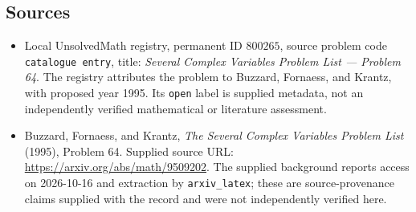 \documentclass[11pt]{article}
\begin{document}
\subsection{Sources}
\begin{itemize}
\item Local UnsolvedMath registry, permanent ID \(800265\), source problem code \texttt{catalogue entry}, title: \emph{Several Complex Variables Problem List --- Problem 64}. The registry attributes the problem to Buzzard, Fornaess, and Krantz, with proposed year 1995. Its \texttt{open} label is supplied metadata, not an independently verified mathematical or literature assessment.
\item Buzzard, Fornaess, and Krantz, \emph{The Several Complex Variables Problem List} (1995), Problem 64. Supplied source URL: \url{https://arxiv.org/abs/math/9509202}. The supplied background reports access on 2026-10-16 and extraction by \texttt{arxiv\_latex}; these are source-provenance claims supplied with the record and were not independently verified here.
\end{itemize}
\end{document}
